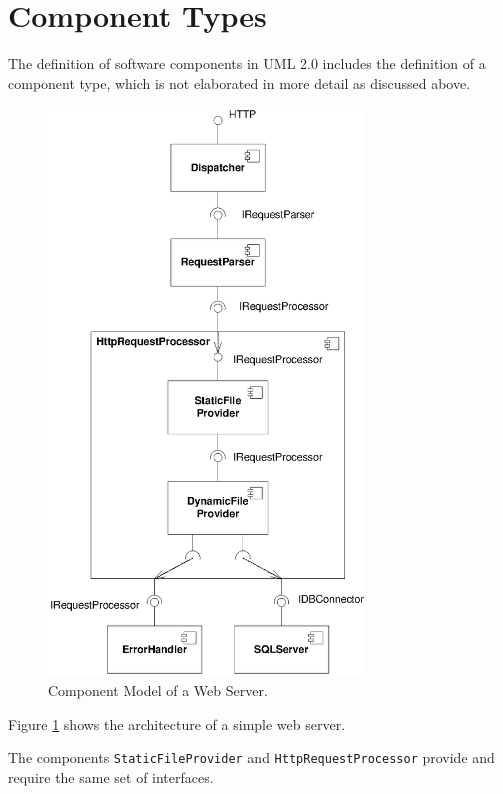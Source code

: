 \section{Component Types}
The definition of software components in UML 2.0 includes the definition of a component type, which is not elaborated in more detail as discussed above.

\begin{figure}
\centering
\includegraphics[width=3.3in]{example/WebserverComponents}
\caption{Component Model of a Web Server.}
\label{fig:WebserverComponents}
\end{figure}

Figure \ref{fig:WebserverComponents} shows the architecture of a simple web server. 


The components \texttt{StaticFileProvider} and \texttt{HttpRequestProcessor} provide and require the same set of interfaces.

